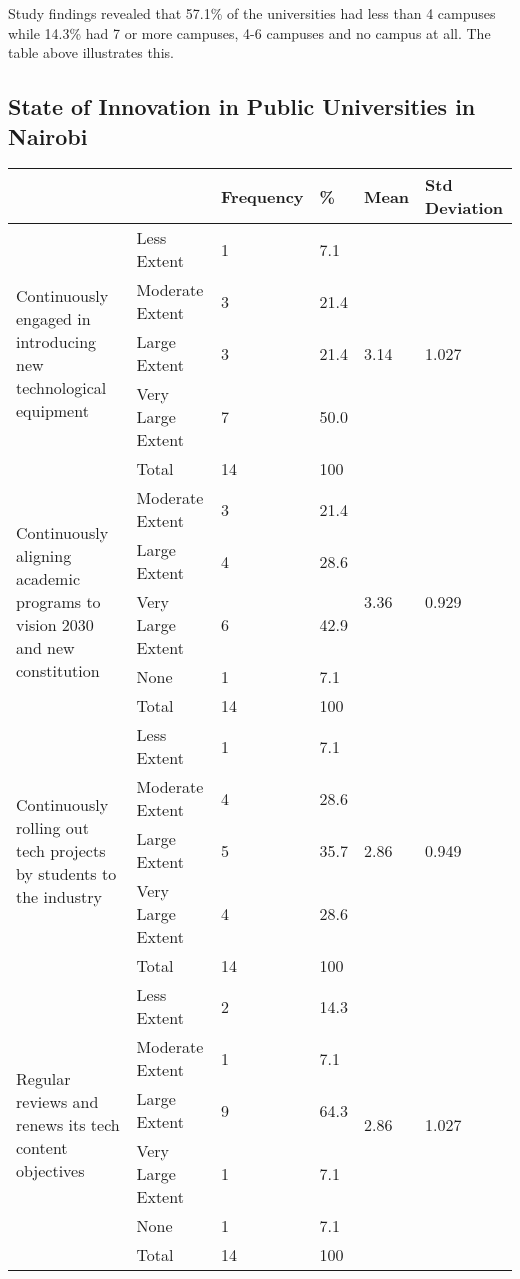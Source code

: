 Study findings revealed that 57.1\% of the universities had less than 4 campuses while 14.3\% had 7 or more campuses, 4-6 campuses and no campus at all. The table above illustrates this.

\subsection{\textbf{State of Innovation in Public Universities in Nairobi}}

\begin{table}[ht]
    \centering
    \begin{tabular}{|p{3.8cm}|l|l|l|l|l|}
   \hline
   \multicolumn{2}{|l|}{} & \textbf{Frequency} & \textbf{\%} & \textbf{Mean} & \textbf{Std Deviation}\\ \hline
   \multirow{5}{3cm}{Continuously engaged in introducing new technological equipment} & Less Extent & 1 & 7.1 & \multirow{5}{3cm}{3.14} & \multirow{5}{3cm}{1.027}\\  
   & Moderate Extent & 3 & 21.4 & &\\ 
   & Large Extent & 3 & 21.4 & &\\ 
   & Very Large Extent & 7 & 50.0 & &\\ 
   & Total & 14 & 100 & &\\ \hline

   \multirow{5}{3cm}{Continuously aligning academic programs to vision 2030 and new constitution} & Moderate Extent & 3 & 21.4 & \multirow{5}{3cm}{3.36} & \multirow{5}{3cm}{0.929}\\  
   & Large Extent & 4 & 28.6 & & \\ 
   & Very Large Extent & 6 & 42.9 & &\\ 
   & None & 1 & 7.1 & &\\ 
   & Total & 14 & 100 & &\\ \hline

   \multirow{5}{3cm}{Continuously rolling out tech projects by students to the industry} & Less Extent & 1 & 7.1 & \multirow{5}{3cm}{2.86} & \multirow{5}{3cm}{0.949}\\  
   & Moderate Extent & 4 & 28.6 & & \\ 
   & Large Extent & 5 & 35.7 & &\\ 
   & Very Large Extent & 4 & 28.6 & &\\ 
   & Total & 14 & 100 & &\\ \hline

   \multirow{6}{3cm}{Regular reviews and renews its tech content objectives} & Less Extent & 2 & 14.3 & \multirow{6}{3cm}{2.86} & \multirow{6}{3cm}{1.027}\\  
   & Moderate Extent & 1 & 7.1 & & \\ 
   & Large Extent & 9 & 64.3 & &\\ 
   & Very Large Extent & 1 & 7.1 & &\\ 
   & None & 1 & 7.1 & &\\ 
   & Total & 14 & 100 & &\\ \hline


\end{tabular}
\end{table}
